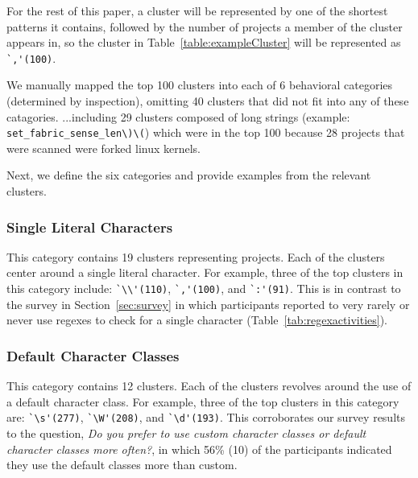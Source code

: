 For the rest of this paper, a cluster will be represented by one of the shortest patterns it contains, followed by the number of projects a member of the cluster appears in, so the cluster in Table~\ref{table:exampleCluster} will be represented as \verb!`,'(100)!.

We  manually mapped the top 100 clusters into each of 6 behavioral categories (determined by inspection), omitting 40 clusters that did not fit into any of these catagories.
\leavevmode\color{gray}
 ...including 29 clusters composed of long strings (example: \verb!set_fabric_sense_len\)\(!) which were in the top 100 because 28 projects that were scanned were forked linux kernels.
\leavevmode\color{black}

Next, we define the six categories and provide examples from the relevant clusters.

\subsubsection{Single Literal Characters}
This category contains 19 clusters representing  projects. Each of the clusters center around a single literal character. For example, three of the top clusters in this category include:
\verb!`\\'(110)!, \verb!`,'(100)!, and \verb!`:'(91)!. This is in contrast to the survey in Section~\ref{sec:survey} in which participants reported to very rarely or never use regexes to check for a single character (Table~\ref{tab:regexactivities}).

\subsubsection{Default Character Classes}
This category contains 12 clusters. Each of the clusters revolves around the use of a default character class. For example, three of the top clusters in this category are:
\verb!`\s'(277)!, \verb!`\W'(208)!, and \verb!`\d'(193)!. This corroborates our survey results to the question, \emph{Do you prefer to use custom character classes or default character classes more often?}, in which 56\% (10) of the participants indicated they use the default classes more than custom.


